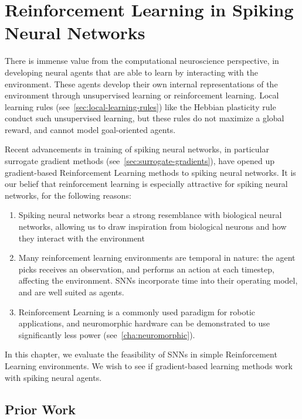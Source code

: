 \documentclass[fyp]{socreport}
\begin{document}
\chapter{Reinforcement Learning in Spiking Neural Networks\label{cha:snnrl}}

There is immense value from the computational neuroscience perspective, in
developing neural agents that are able to learn by interacting with the
environment. These agents develop their own internal representations of the
environment through unsupervised learning or reinforcement learning. Local
learning rules (see~\autoref{sec:local-learning-rules}) like the Hebbian
plasticity rule conduct such unsupervised learning, but these rules do not
maximize a global reward, and cannot model goal-oriented agents.

Recent advancements in training of spiking neural networks, in particular
surrogate gradient methods (see~\autoref{sec:surrogate-gradients}), have opened
up gradient-based Reinforcement Learning methods to spiking neural networks. It
is our belief that reinforcement learning is especially attractive for spiking
neural networks, for the following reasons:

\begin{enumerate}
  \item Spiking neural networks bear a strong resemblance with biological neural
    networks, allowing us to draw inspiration from biological neurons and how
    they interact with the environment
  \item Many reinforcement learning environments are temporal in nature: the
    agent picks receives an observation, and performs an action at each
    timestep, affecting the environment. SNNs incorporate time into their
    operating model, and are well suited as agents.
  \item Reinforcement Learning is a commonly used paradigm for robotic
    applications, and neuromorphic hardware can be demonstrated to use
    significantly less power (see~\autoref{cha:neuromorphic}).
\end{enumerate}

In this chapter, we evaluate the feasibility of SNNs in simple Reinforcement
Learning environments. We wish to see if gradient-based learning methods work
with spiking neural agents.

\section{Prior Work}
\end{document}
